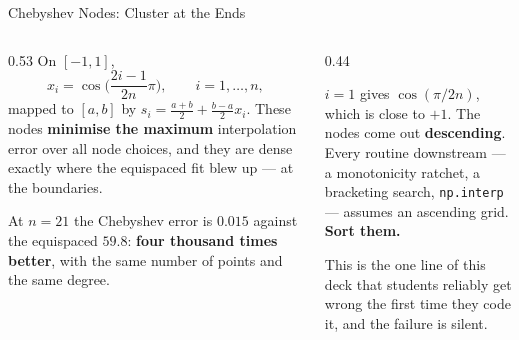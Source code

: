 \begin{frame}{Chebyshev Nodes: Cluster at the Ends}
\begin{columns}[T]
\begin{column}{0.53\textwidth}
\small
On $[-1,1]$,
\[
  x_i=\cos\!\Big(\frac{2i-1}{2n}\pi\Big), \qquad i=1,\dots,n,
\]
mapped to $[a,b]$ by $s_i=\tfrac{a+b}{2}+\tfrac{b-a}{2}x_i$. These nodes \textbf{minimise the maximum} interpolation error over all node choices, and they are dense exactly where the equispaced fit blew up --- at the boundaries.
\medskip

At $n=21$ the Chebyshev error is $0.015$ against the equispaced $59.8$: \textbf{four thousand times better}, with the same number of points and the same degree.
\end{column}
\begin{column}{0.44\textwidth}
\begin{cautionbox}[title=\textbf{Read the formula carefully}]\small
$i=1$ gives $\cos(\pi/2n)$, which is close to $+1$. The nodes come out \textbf{descending}.\\[1mm]
Every routine downstream --- a monotonicity ratchet, a bracketing search, \texttt{np.interp} --- assumes an ascending grid. \textbf{Sort them.}
\end{cautionbox}
\medskip
\begin{examplebox}\footnotesize
This is the one line of this deck that students reliably get wrong the first time they code it, and the failure is silent.
\end{examplebox}
\end{column}
\end{columns}
\vspace{1mm}
\end{frame}

